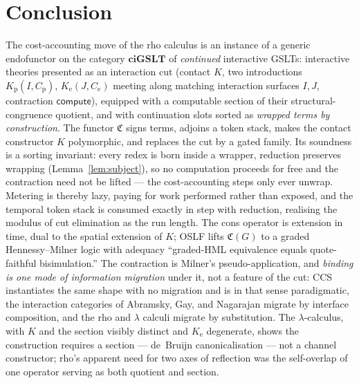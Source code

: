 \documentclass[11pt]{article}
\theoremstyle{definition}
\theoremstyle{plain}
\newcommand{\ciGSLT}{\mathbf{ciGSLT}}
\newcommand{\Cost}{\mathfrak{C}}              %
\newcommand{\compute}{\mathsf{compute}}
\newcommand{\Kp}{K_{\mathrm{p}}}
\newcommand{\Ke}{K_{\mathrm{e}}}
\begin{document}
\section{Conclusion}
\label{sec:conclusion}

The cost-accounting move of the rho calculus is an instance of a generic
endofunctor on the category $\ciGSLT$ of \emph{continued} interactive
GSLTs: interactive theories presented as an interaction cut
(contact $K$, two introductions $\Kp(I,C_{\mathrm p})$,
$\Ke(J,C_{\mathrm e})$ meeting along matching interaction surfaces $I,J$,
contraction $\compute$), equipped with a
computable section of their structural-congruence quotient, and with
continuation slots sorted as \emph{wrapped terms by construction}. The
functor $\Cost$ signs terms, adjoins a token stack, makes the contact
constructor $K$ polymorphic, and replaces the cut by a gated family. Its
soundness is a sorting invariant: every redex is born inside a wrapper,
reduction preserves wrapping (Lemma~\ref{lem:subject}), so no computation
proceeds for free and the contraction need not be lifted --- the
cost-accounting steps only ever unwrap. Metering is thereby lazy, paying
for work performed rather than exposed, and the temporal token stack is
consumed exactly in step with reduction, realising the modulus of cut
elimination as the run length. The cons operator is extension in time,
dual to the spatial extension of $K$; OSLF lifts $\Cost(G)$ to a graded
Hennessy--Milner logic with adequacy ``graded-HML equivalence equals
quote-faithful bisimulation.'' The contraction is Milner's
pseudo-application, and \emph{binding is one mode of information migration}
under it, not a feature of the cut: CCS instantiates the same shape with
no migration and is in that sense paradigmatic, the interaction categories
of Abramsky, Gay, and Nagarajan migrate by interface composition, and the
rho and $\lambda$ calculi migrate by substitution. The $\lambda$-calculus,
with $K$ and the
section visibly distinct and $\Ke$ degenerate, shows the construction
requires a section --- de~Bruijn canonicalisation --- not a channel
constructor; rho's apparent need for two axes of reflection was the
self-overlap of one operator serving as both quotient and section.
\end{document}

